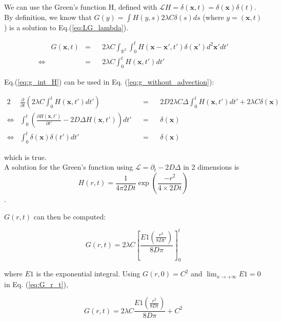 We can use the Green's function H, defined with $\mathcal{L}H=\delta(\boldsymbol{x},t)=\delta(\boldsymbol{x})\delta(t)$. \\

By definition, we know that $G(y)=\int H(y,s)2\lambda C\delta(s)ds$
(where $y=(\boldsymbol{x},t)$) is a solution to Eq.(\ref{eq:LG_lambda}).

\begin{align}
 & G(\boldsymbol{x},t) & = & & 2\lambda C\int_{\mathbb{R}^{2}}\int_{0}^{t}H(\boldsymbol{x}-\boldsymbol{x}',t')\delta(\boldsymbol{x}')d^2\boldsymbol{x}'dt'\nonumber \\
\Leftrightarrow &  & = &  & 2\lambda C\int_{0}^{t}H(\boldsymbol{x},t')dt'\label{eq:g_int_H}
\end{align}

Eq.(\ref{eq:g_int_H}) can be used in Eq. (\ref{eq:g_without_advection}):

\begin{alignat*}{2}
 & \frac{\partial}{\partial t}\left(2\lambda C\int_{0}^{t}H(\boldsymbol{x},t')dt'\right) & & = & & 2D2\lambda C\Delta\int_{0}^{t}H(\boldsymbol{x},t')dt'+2\lambda C\delta(\boldsymbol{x})\\
\Leftrightarrow & \int_{0}^{t}\left(\frac{\partial H(\boldsymbol{x},t')}{\partial t'}-2D\Delta H(\boldsymbol{x},t')\right)dt' & & = & & \delta(\boldsymbol{x})\\
\Leftrightarrow & \int_{0}^{t}\delta(\boldsymbol{x})\delta(t')dt' & & = & & \delta(\boldsymbol{x})
\end{alignat*}

which is true. \\

A solution for the Green's function using $\mathcal{L}=\partial_{t}-2D\Delta$
in 2 dimensions is $$H(r,t)=\frac{1}{4\pi2Dt}\exp(\frac{-r^{2}}{4\times2Dt})$$. 

$G(r,t)$ can then be computed:

\begin{equation}
G(r,t)=2\lambda C\left[\frac{E1\left(\frac{r^{2}}{8Dt'}\right)}{8D\pi}\right]_{0}^{t}\label{eq:G_r_t}
\end{equation}

where $E1$ is the exponential integral. Using $G(r,0)=C^{2}$ and
$\lim_{x\rightarrow+\infty}E1=0$ in Eq. (\ref{eq:G_r_t}), 

\begin{equation}
G(r,t)=2\lambda C\frac{E1\left(\frac{r^{2}}{8Dt}\right)}{8D\pi}+C^{2}
\end{equation}

